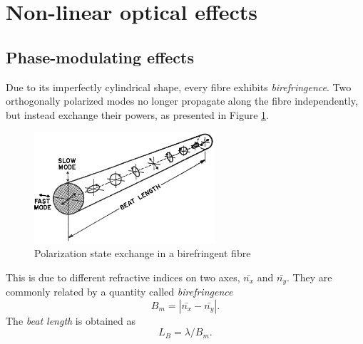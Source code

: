 \documentclass{standalone}
\begin{document}
\section{Non-linear optical effects}

\subsection{Phase-modulating effects}

Due to its imperfectly cylindrical shape, every fibre exhibits \textit{birefringence}. Two orthogonally polarized modes no longer propagate along the fibre independently, but instead exchange their powers, as presented in Figure \ref{fig:birefringence}.
\begin{figure}[h]
	\centering
	\includegraphics[width=0.6\textwidth]{birefringence.png}
	\caption{Polarization state exchange in a birefringent fibre \cite{agrawal}}
	\label{fig:birefringence}
\end{figure}
This is due to different refractive indices on two axes, $\bar{n_x}$ and $\bar{n_y}$. They are commonly related by a quantity called \textit{birefringence}
\begin{equation}
B_m = \left| \bar{n_x} - \bar{n_y} \right| \textrm{.}
\end{equation}
The \textit{beat length} is obtained as
\begin{equation}
L_B = \lambda / B_m \textrm{.}
\end{equation}
\end{document}

